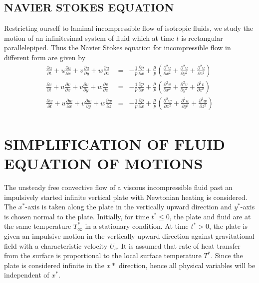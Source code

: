 \documentclass[11pt]{report}
\newcommand{\sps}{\\[0.2cm]}
\begin{document}
	\subsection{NAVIER STOKES EQUATION}
	Restricting ourself to laminal incompressible flow of isotropic fluids, we study the motion of an infinitesimal system of fluid which at time $t$ is rectangular parallelepiped. Thus the Navier Stokes equation for incompressible flow in different form are given by
	\begin{eqnarray*}
			\frac{\partial u}{\partial t} + u\frac{\partial u}{\partial x} + v\frac{\partial u}{\partial y} + w\frac{\partial u}{\partial z} &=& - \frac{1}{p}\frac{\partial p}{\partial x} + \frac{\mu}{p}\left(\frac{\partial^2 u}{\partial x^2}+\frac{\partial^2 u}{\partial y^2} + \frac{\partial^2 u}{\partial z^2}\right)\sps
			\frac{\partial v}{\partial t} + u\frac{\partial v}{\partial x} + v\frac{\partial v}{\partial y} + w\frac{\partial v}{\partial z} &=& - \frac{1}{p}\frac{\partial p}{\partial x} + \frac{\mu}{p}\left(\frac{\partial^2 v}{\partial x^2}+\frac{\partial^2 v}{\partial y^2} + \frac{\partial^2 v}{\partial z^2}\right)\sps
			\frac{\partial w}{\partial t} + u\frac{\partial w}{\partial x} + v\frac{\partial w}{\partial y} + w\frac{\partial w}{\partial z} &=& - \frac{1}{p}\frac{\partial p}{\partial x} + \frac{\mu}{p}\left(\frac{\partial^2 w}{\partial x^2}+\frac{\partial^2 w}{\partial y^2} + \frac{\partial^2 w}{\partial z^2}\right)\sps
	\end{eqnarray*}
	
	\section{SIMPLIFICATION OF FLUID EQUATION OF MOTIONS}
	The unsteady free convective flow of a viscous incompressible fluid past an impulsively started infinite vertical plate with Newtonian heating is considered. The $x^*$-axis is taken along the plate in the vertically upward direction and $y^*$-axis is chosen normal to the plate. Initially, for time $t^* \leq 0$, the plate and fluid are at the same temperature $T^*_\infty$ in a stationary condition. At time $t^* > 0$, the plate is given an impulsive motion in the vertically upward direction against gravitational field with a characteristic velocity $U_c$. It is assumed that rate of heat transfer from the surface is proportional to the local surface temperature $T^*$. Since the plate is considered infinite in the $x*$ direction, hence all physical variables will be independent of $x^*$. 
	
\end{document}
